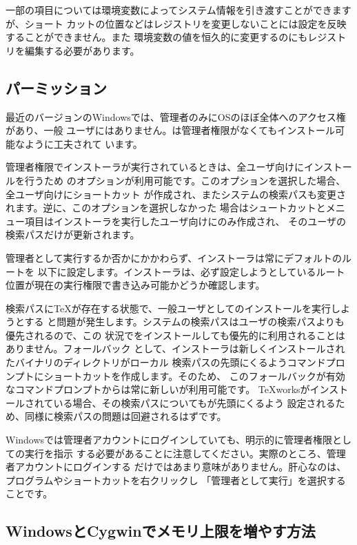 \documentclass[uplatex,dvipdfmx,12pt,tombow]{jsarticle}
\begin{document}
一部の項目については環境変数によってシステム情報を引き渡すことができますが、ショート
カットの位置などはレジストリを変更しないことには設定を反映することができません。また
環境変数の値を恒久的に変更するのにもレジストリを編集する必要があります。

\subsection{パーミッション}
\label{sec:winpermissions}

最近のバージョンのWindowsでは、管理者のみにOSのほぼ全体へのアクセス権があり、一般
ユーザにはありません。\TL は管理者権限がなくてもインストール可能なように工夫されて
います。

管理者権限でインストーラが実行されているときは、全ユーザ向けにインストールを行うため
のオプションが利用可能です。このオプションを選択した場合、全ユーザ向けにショートカット
が作成され、またシステムの検索パスも変更されます。逆に、このオプションを選択しなかった
場合はシュートカットとメニュー項目はインストーラを実行したユーザ向けにのみ作成され、
そのユーザの検索パスだけが更新されます。

管理者として実行するか否かにかかわらず、インストーラは常にデフォルトの\TL ルートを
以下に設定します。インストーラは、必ず設定しようとしているルート
位置が現在の実行権限で書き込み可能かどうか確認します。

検索パスに\TeX が存在する状態で、一般ユーザとして\TL のインストールを実行しようとする
と問題が発生します。システムの検索パスはユーザの検索パスよりも優先されるので、この
状況で\TL をインストールしても優先的に利用されることはありません。フォールバック
として、インストーラは新しくインストールされた\TL バイナリのディレクトリがローカル
検索パスの先頭にくるようコマンドプロンプトにショートカットを作成します。そのため、
このフォールバックが有効なコマンドプロンプトからは常に新しい\TL が利用可能です。
\TeX worksがインストールされている場合、その検索パスについても\TL が先頭にくるよう
設定されるため、同様に検索パスの問題は回避されるはずです。

Windowsでは管理者アカウントにログインしていても、明示的に管理者権限としての実行を指示
する必要があることに注意してください。実際のところ、管理者アカウントにログインする
だけではあまり意味がありません。肝心なのは、プログラムやショートカットを右クリックし
「管理者として実行」を選択することです。

\subsection{WindowsとCygwinでメモリ上限を増やす方法}
\label{sec:cygwin-maxmem}
\end{document}
